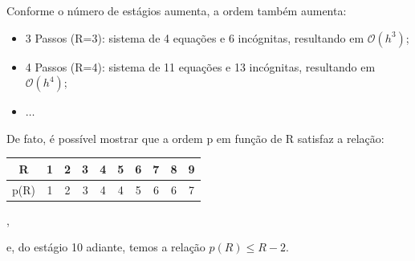 \documentclass[../differential_methods.tex]{subfiles}
\begin{document}
Conforme o número de estágios aumenta, a ordem também aumenta:
\begin{itemize}
	\item 3 Passos (R=3): sistema de 4 equações e 6 incógnitas, resultando em \(\mathcal{O}(h^{3})\);
	\item 4 Passos (R=4): sistema de 11 equações e 13 incógnitas, resultando em \(\mathcal{O}(h^{4})\);
	\item \(\dotsc \)
\end{itemize}

De fato, é possível mostrar que a ordem p em função de R satisfaz a relação:
\begin{table}[H]
	\centering
	\begin{tabular}{c | c c c c c c c c c}
		R    & 1 & 2 & 3 & 4 & 5 & 6 & 7 & 8 & 9 \\
		\hline
		p(R) & 1 & 2 & 3 & 4 & 4 & 5 & 6 & 6 & 7 \\
	\end{tabular},
\end{table}
e, do estágio 10 adiante, temos a relação \(p(R)\leq R-2\).
\end{document}
